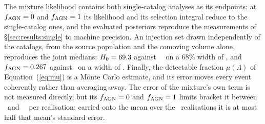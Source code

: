 The mixture likelihood contains both single-catalog analyses as its
endpoints: at $f_{\rm AGN} = 0$ and $f_{\rm AGN} = 1$ its likelihood and its selection
integral reduce to the single-catalog ones, and the evaluated posteriors
reproduce the measurements of \S\ref{sec:results:single} to machine
precision. An injection set drawn independently of the
catalogs, from the source population and the comoving volume alone,
reproduces the joint medians: $H_0 = 69.3$ against
\HzeroJointMedian~\kmsmpc\ on a 68\% width of \HzeroJointWidth, and
$f_{\rm AGN} = 0.267$ against \FagnJointMedian\ on a width of
\FagnJointWidth. Finally, the detectable fraction $\mu(\Lambda)$ of
Equation~(\ref{eq:mu}) is a Monte Carlo estimate, and its error moves every
event coherently rather than averaging away. The error of the mixture's own
term is not measured directly, but its $f_{\rm AGN} = 0$ and $f_{\rm AGN} = 1$ limits
bracket it between \SelMcJointLo\ and \SelMcJointHi~\kmsmpc\ per
realisation; carried onto the mean over the \ClosureNseeds\ realisations it
is at most half that mean's standard error.
